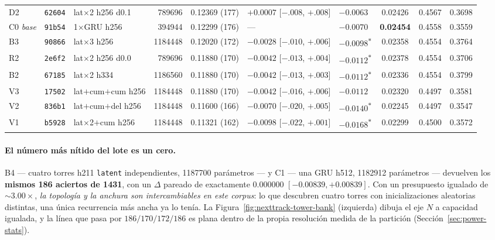 \documentclass[11pt]{article}
\newcommand{\best}[1]{\textbf{#1}}
\begin{document}
\begin{table}[ht]
{\begin{tabular}{lllrlllccc}
    D2 & \texttt{62604} & lat$\times$2 h256 d\num{0.1} & \num{789696} & 0.12369 (177) & $+0.0007$ [$-.008$, $+.008$] & $-0.0063$ & 0.02426 & 0.4567 & 0.3698 \\
    C0 \emph{base} & \texttt{91b54} & 1$\times$GRU h256 & \num{394944} & 0.12299 (176) & --- & $-0.0070$ & \best{0.02454} & 0.4558 & 0.3559 \\
    B3 & \texttt{90866} & lat$\times$3 h256 & \num{1184448} & 0.12020 (172) & $-0.0028$ [$-.010$, $+.006$] & $\mathbf{-0.0098}$\textsuperscript{$\ast$} & 0.02358 & 0.4554 & 0.3764 \\
    R2 & \texttt{2e6f2} & lat$\times$2 h256 d\num{0.0} & \num{789696} & 0.11880 (170) & $-0.0042$ [$-.013$, $+.004$] & $\mathbf{-0.0112}$\textsuperscript{$\ast$} & 0.02378 & 0.4554 & 0.3706 \\
    B2 & \texttt{67185} & lat$\times$2 h334 & \num{1186560} & 0.11880 (170) & $-0.0042$ [$-.013$, $+.003$] & $\mathbf{-0.0112}$\textsuperscript{$\ast$} & 0.02336 & 0.4554 & 0.3799 \\
    V3 & \texttt{17502} & lat$+$cum$+$cum h256 & \num{1184448} & 0.11880 (170) & $-0.0042$ [$-.016$, $+.006$] & $-0.0112$ & 0.02320 & 0.4497 & 0.3581 \\
    V2 & \texttt{836b1} & lat$+$cum$+$del h256 & \num{1184448} & 0.11600 (166) & $-0.0070$ [$-.020$, $+.005$] & $\mathbf{-0.0140}$\textsuperscript{$\ast$} & 0.02245 & 0.4497 & 0.3547 \\
    V1 & \texttt{b5928} & lat$\times$2$+$cum h256 & \num{1184448} & 0.11321 (162) & $-0.0098$ [$-.022$, $+.001$] & $\mathbf{-0.0168}$\textsuperscript{$\ast$} & 0.02299 & 0.4500 & 0.3572 \\
    \bottomrule
  \end{tabular}}
\end{table}

\paragraph{El número más nítido del lote es un cero.} B4 --- cuatro torres h211
\texttt{latent} independientes, \num{1187700} parámetros --- y C1 --- una GRU h512,
\num{1182912} parámetros --- devuelven los \textbf{mismos \num{186} aciertos de
\num{1431}}, con un $\Delta$ pareado de exactamente $\num{0.000000}$
$[-\num{0.00839},+\num{0.00839}]$. Con un presupuesto igualado de
${\sim}\num{3.00}\times$, \emph{la topología y la anchura son intercambiables en
este corpus}: lo que descubren cuatro torres con inicializaciones aleatorias
distintas, una única recurrencia más ancha ya lo tenía. La
Figura~\ref{fig:nexttrack-tower-bank} (izquierda) dibuja el eje $N$ a capacidad
igualada, y la línea que pasa por $\num{186}/\num{170}/\num{172}/\num{186}$ es
plana dentro de la propia resolución medida de la partición
(Sección~\ref{sec:power-stats}).
\end{document}
